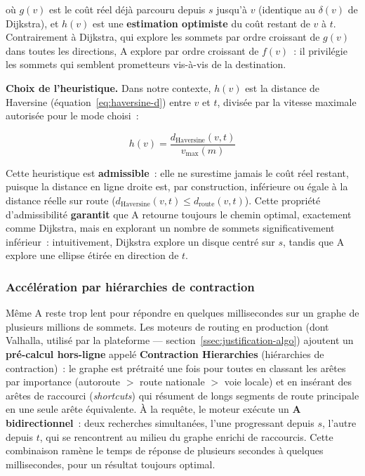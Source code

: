 \documentclass[12pt, a4paper]{report}
\begin{document}
où $g(v)$ est le coût réel déjà parcouru depuis $s$ jusqu'à $v$ (identique au
$\delta(v)$ de Dijkstra), et $h(v)$ est une \textbf{estimation optimiste} du
coût restant de $v$ à $t$. Contrairement à Dijkstra, qui explore les sommets
par ordre croissant de $g(v)$ dans toutes les directions, A\* explore par
ordre croissant de $f(v)$~: il privilégie les sommets qui semblent
\og prometteurs \fg{} vis-à-vis de la destination.

\textbf{Choix de l'heuristique.} Dans notre contexte, $h(v)$ est la distance
de Haversine (équation~\eqref{eq:haversine-d}) entre $v$ et $t$, divisée par
la vitesse maximale autorisée pour le mode choisi~:

\begin{equation}
  h(v) = \frac{d_{\text{Haversine}}(v, t)}{v_{\text{max}}(m)}
  \label{eq:heuristique-h}
\end{equation}

Cette heuristique est \textbf{admissible}~: elle ne surestime jamais le coût
réel restant, puisque la distance en ligne droite est, par construction,
inférieure ou égale à la distance réelle sur route
($d_{\text{Haversine}}(v,t) \leq d_{\text{route}}(v,t)$). Cette propriété
d'admissibilité \textbf{garantit} que A\* retourne toujours le chemin
optimal, exactement comme Dijkstra, mais en explorant un nombre de sommets
significativement inférieur~: intuitivement, Dijkstra explore un disque
centré sur $s$, tandis que A\* explore une ellipse étirée en direction de
$t$.

\subsubsection{Accélération par hiérarchies de contraction}

Même A\* reste trop lent pour répondre en quelques millisecondes sur un
graphe de plusieurs millions de sommets. Les moteurs de routing en production
(dont Valhalla, utilisé par la plateforme --- section~\ref{ssec:justification-algo})
ajoutent un \textbf{pré-calcul hors-ligne} appelé \textbf{Contraction
Hierarchies} (hiérarchies de contraction)~: le graphe est prétraité une fois
pour toutes en classant les arêtes par importance (autoroute $>$ route
nationale $>$ voie locale) et en insérant des arêtes de raccourci
(\textit{shortcuts}) qui résument de longs segments de route principale en
une seule arête équivalente. À la requête, le moteur exécute un \textbf{A\*
bidirectionnel}~: deux recherches simultanées, l'une progressant depuis $s$,
l'autre depuis $t$, qui se rencontrent au milieu du graphe enrichi de
raccourcis. Cette combinaison ramène le temps de réponse de plusieurs
secondes à quelques millisecondes, pour un résultat toujours optimal.
\end{document}
